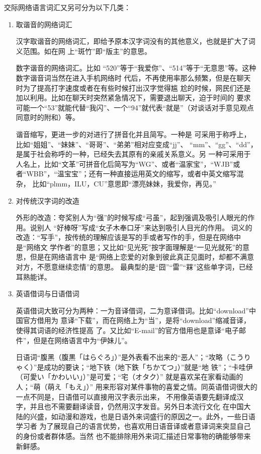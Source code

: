 交际网络语言词汇又另可分为以下几类：
\begin{enumerate}

\item 取谐音的网络词汇

汉字取谐音的网络词汇，即给予原本汉字词没有的其他意义，也就是扩大了词义范围。如在网
上“斑竹”即“版主”的意思。

数字谐音的网络词汇。比如
“520”等于“我爱你”、“514”等于“无意思”等。这种数字谐音词当然在进入手机网络时
代后，不再使用率那么频繁，但是在聊天时为了提高打字速度或者在有些时候打出汉字觉得尴
尬的时候，网民们还是加以利用。比如在聊天时突然紧急情况下，需要退出聊天，迫于时间的
要求可能一个“53”就能代替“我闪”、一个“94”就代表“就是”（对谈话对手意见观点
同意时的附和）等。

谐音缩写，更进一步的对进行了拼音化并且简写。一种是
可采用于称呼上，比如“姐姐”、“妹妹”、“哥哥”、“弟弟”相对应变成“jj”、
“mm”、“gg”、“dd”，是属于社会称呼的一种，已经失去其原有的亲戚关系意义。另
一种可采用于人名上，比如“文革”可拼音化后简写为“WG”、或者“温家宝”，“WJB”或
者“WBB”，“温宝宝”；还有一种直接运用英文的缩写，或者中英文缩写混杂，
比如“plmm，ILU，CU”意思即“漂亮妹妹，我爱你，再见。”

\item 对传统汉字词的改造

外形的改造：夸奖别人为“强”的时候写成“弓虽”，起到强调及吸引人眼光的作用。说别人
“好棒呀”写成“女子木奉口牙”来达到吸引人目光的作用。
词义的改造：“写手”，按传统的理解应该是写的手或者写作的手，但是在网络中是“网络文
学作者”的意思；又比如“见光死”按字面理解是“一见光就死”的意思，但是在网络语言中
是“网络上恋爱的对象到彼此真正见面时，却都不满意对方，不愿意继续恋情”的意思。
最典型的是“囧”“雷”“槑”这些单字词，已经耳熟能详。

\item 英语借词与日语借词

英语借词大致可分为两种：一为音译借词，二为意译借词。比如“download”中国官方借用为
意译“下载”，而在网络上为“当”，是将“download”缩减音译，使得其词语的经济性提高
了。又比如“E-mail”的官方借用也是意译“电子邮件”，但是在网络语言中为“伊妹儿”。

日语词“腹黑（{\mincho 腹黒「はらぐろ」}）”是外表看不出来的“恶人”；“{\mincho 攻略}（{\mincho こうりゃく}）”是成功的要诀；“地下铁（{\mincho 地下鉄「ちかてつ」}）”就是“地
铁”；“卡哇伊（{\mincho 可愛い「かわいい」}）”是可爱；“{\mincho 宅}（{\mincho オタク}）”
就是喜欢呆在家看动画的人；“萌（{\mincho 萌え「もえ」}）”
用来形容对某件事物的喜爱之情。同英语借词很大的一点不同是，日语借可以直接用汉字表示出来，
不用像英语要先翻译成汉字，并且也不需要翻译读音，仍然用汉字发音。另外日本流行文化
在中国大陆的兴盛，如动漫和游戏，也是日语外来词盛行的原因之一。此外，一些日语学习者
为了展现自己的语言优势，也喜欢用日语音译或者意译词来突显自己的身份或者群体感。当然
也不能排除用外来词汇描述日常事物的确能够带来新鲜感。


\end{enumerate}
